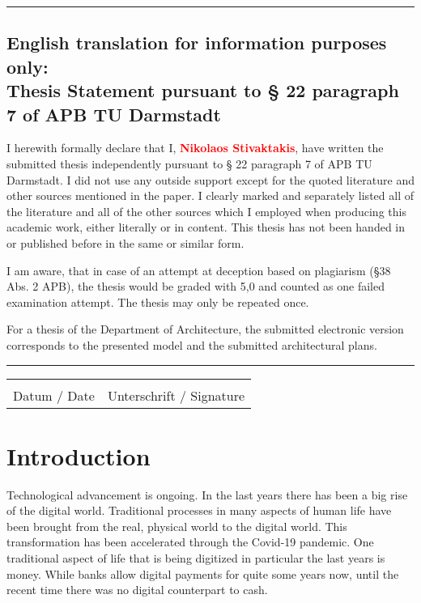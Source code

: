 \documentclass{cacthesis}
\begin{document}
	\vspace{10pt}
	\hrule
	
	\section*{English translation for information purposes only:\\Thesis Statement pursuant to § 22 paragraph 7 of APB TU Darmstadt}
	
	I herewith formally declare that I, \textcolor{red}{\textbf{Nikolaos Stivaktakis}}, have written the submitted thesis independently pursuant to § 22 paragraph 7 of APB TU Darmstadt. I did not use any outside support except for the quoted literature and other sources mentioned in the paper. I clearly marked and separately listed all of the literature and all of the other sources which I employed when producing this academic work, either literally or in content. This thesis has not been handed in or published before in the same or similar form.
	
	I am aware, that in case of an attempt at deception based on plagiarism (§38 Abs. 2 APB), the thesis would be graded with 5,0 and counted as one failed examination attempt. The thesis may only be repeated once.
	
	For a thesis of the Department of Architecture, the submitted electronic version corresponds to the presented model and the submitted architectural plans.
	
	\vspace{10pt}
	\hrule
	\vspace{70pt}
	
	\noindent\begin{tabular}{l@{\hskip 1in}l}
		\makebox[1.8in]{\hrulefill} & \makebox[3.5in]{\hrulefill}\\
		Datum / Date & Unterschrift / Signature
	\end{tabular}
	
	\listoffigures
	\listoftables
	\tableofcontents
	
	\mainmatter
	
	\chapter{Introduction}
	Technological advancement is ongoing. In the last years there has been a big rise of the digital world.  Traditional processes in many aspects of human life have been brought from the real, physical world to the digital world. This transformation has been accelerated through the Covid-19 pandemic. One traditional aspect of life that is being digitized in particular the last years is money. While banks allow digital payments for quite some years now, until the recent time there was no digital counterpart to cash. \newline%
	
\end{document}
